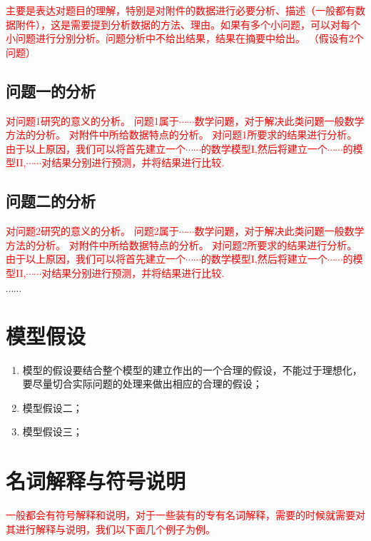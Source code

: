 \documentclass[12pt,a4paper]{mcmthesis}
\begin{document}
\textcolor{red}{主要是表达对题目的理解，特别是对附件的数据进行必要分析、描述（一般都有数据附件），这是需要提到分析数据的方法、理由。如果有多个小问题，可以对每个小问题进行分别分析。问题分析中不给出结果，结果在摘要中给出。
（假设有2个问题）}

\subsection{问题一的分析}

 \textcolor{red}{对问题1研究的意义的分析。
问题1属于$\cdots\cdots$数学问题，对于解决此类问题一般数学方法的分析。
对附件中所给数据特点的分析。
对问题1所要求的结果进行分析。
由于以上原因，我们可以将首先建立一个$\cdots\cdots$的数学模型I,然后将建立一个$\cdots\cdots$的模型II,$\cdots\cdots$对结果分别进行预测，并将结果进行比较.
}


\subsection{问题二的分析}
 \textcolor{red}{对问题2研究的意义的分析。
问题2属于$\cdots\cdots$数学问题，对于解决此类问题一般数学方法的分析。
对附件中所给数据特点的分析。
对问题2所要求的结果进行分析。
由于以上原因，我们可以将首先建立一个$\cdots\cdots$的数学模型I,然后将建立一个$\cdots\cdots$的模型II,$\cdots\cdots$对结果分别进行预测，并将结果进行比较.
}

 $\cdots\cdots$


\section{模型假设}
\begin{enumerate}
  \item 模型的假设要结合整个模型的建立作出的一个合理的假设，不能过于理想化，要尽量切合实际问题的处理来做出相应的合理的假设；
  \item 模型假设二；
  \item 模型假设三；
\end{enumerate}

\section{名词解释与符号说明}

\textcolor{red}{一般都会有符号解释和说明，对于一些装有的专有名词解释，需要的时候就需要对其进行解释与说明，我们以下面几个例子为例。}
\end{document}
